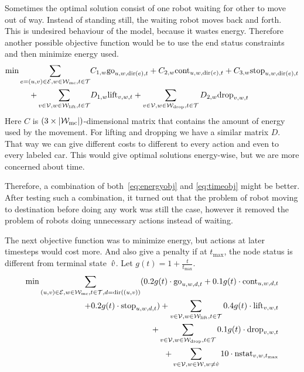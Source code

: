 Sometimes the optimal solution consist of one robot waiting for other to move
out of way. Instead of standing still, the waiting robot moves back and forth.
This is undesired behaviour of the model, because it wastes energy. Therefore
another possible objective function would be to use the end status constraints
and then minimize energy used.
\begin{align}
    \begin{split}
        \label{eq:energyobj}
        \min \sum_{e=(u,v) \in \mathcal{E},w \in \mathcal{W}_\mathrm{mc},t \in \mathcal{T}}
        &C_{1,w} \mathrm{go}_{u,w,\mathrm{dir}(e),t} + C_{2,w} \mathrm{cont}_{u,w,\mathrm{dir}(e),t} + C_{3,w}
        \mathrm{stop}_{u,w,\mathrm{dir}(e),t}\\
        +\sum_{v \in \mathcal{V}, w \in \mathcal{W}_\mathrm{lift},t \in \mathcal{T}} &D_{1,w} \mathrm{lift}_{v,w,t}
        +\sum_{v \in \mathcal{V}, w \in \mathcal{W}_\mathrm{drop},t \in \mathcal{T}} D_{2,w} \mathrm{drop}_{v,w,t}
    \end{split}
\end{align}
Here $C$ is $(3 \times |\mathcal{W}_\mathrm{mc}|)$-dimensional matrix that contains the amount of
energy used by the movement. For lifting and dropping we have a similar matrix
$D$. That way we can give different costs to different to every action and even
to every labeled car. This would give optimal solutions energy-wise,
but we are more concerned about time.

Therefore, a combination of both~\eqref{eq:energyobj} and \eqref{eq:timeobj}
might be better. After testing such a combination, it turned out that the
problem of robot moving to destination before doing any work was still the
case, however it removed the problem of robots doing unnecessary
actions instead of waiting.

The next objective function was to minimize energy, but actions at later
timesteps would cost more. And also give a penalty if at $t_{\max}$, the node
status is different from terminal state~$\hat{v}$. Let $g(t) = 1 +
\frac{t}{t_{\max}}$.
\begin{align}
    \begin{split}
        \label{eq:objective}
        \min \sum_{(u,v) \in \mathcal{E},w \in \mathcal{W}_\mathrm{mc},t \in \mathcal{T},d=\mathrm{dir}((u,v))}(0.2 g(t) \cdot
        \mathrm{go}_{u,w,d,t} + 0.1 g(t) \cdot \mathrm{cont}_{u,w,d,t}\\ + 0.2 g(t)
        \cdot \mathrm{stop}_{u,w,d,t})
        +\sum_{v \in \mathcal{V}, w \in \mathcal{W}_\mathrm{lift},t \in \mathcal{T}} 0.4 g(t) \cdot \mathrm{lift}_{v,w,t}\\
        +\sum_{v \in \mathcal{V}, w \in \mathcal{W}_\mathrm{drop},t \in \mathcal{T}} 0.1 g(t) \cdot \mathrm{drop}_{v,w,t}\\
        +\sum_{v \in \mathcal{V}, w \in \mathcal{W}, w \neq \hat{v}} 10 \cdot
        \mathrm{nstat}_{v,w,t_{\max}}
    \end{split}
\end{align}

